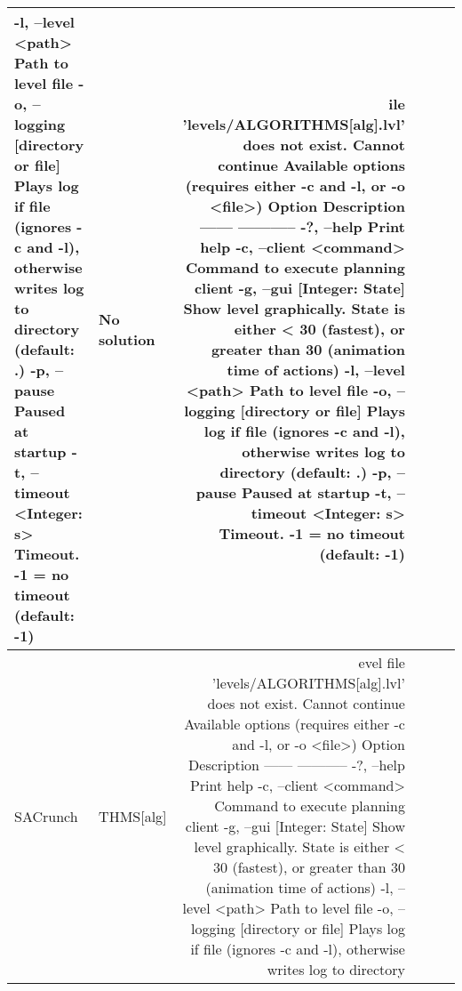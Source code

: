 \begin{tabular}{|l|l|r|r|r|r|}
-l, --level <path>                      Path to level file                     
-o, --logging [directory or file]       Plays log if file (ignores -c and -l), 
                                          otherwise writes log to directory    
                                          (default: .)                         
-p, --pause                             Paused at startup                      
-t, --timeout <Integer: s>              Timeout. -1 = no timeout (default: -1) 
 & No solution & ile 'levels/ALGORITHMS[alg].lvl' does not exist. Cannot continue
Available options (requires either -c and -l, or -o <file>)
Option                                  Description                            
------                                  -----------                            
-?, --help                              Print help                             
-c, --client <command>                  Command to execute planning client     
-g, --gui [Integer: State]              Show level graphically. State is       
                                          either  < 30 (fastest), or greater   
                                          than 30 (animation time of actions)  
-l, --level <path>                      Path to level file                     
-o, --logging [directory or file]       Plays log if file (ignores -c and -l), 
                                          otherwise writes log to directory    
                                          (default: .)                         
-p, --pause                             Paused at startup                      
-t, --timeout <Integer: s>              Timeout. -1 = no timeout (default: -1) 
\\  \hline
SACrunch & THMS[alg] & evel file 'levels/ALGORITHMS[alg].lvl' does not exist. Cannot continue
Available options (requires either -c and -l, or -o <file>)
Option                                  Description                            
------                                  -----------                            
-?, --help                              Print help                             
-c, --client <command>                  Command to execute planning client     
-g, --gui [Integer: State]              Show level graphically. State is       
                                          either  < 30 (fastest), or greater   
                                          than 30 (animation time of actions)  
-l, --level <path>                      Path to level file                     
-o, --logging [directory or file]       Plays log if file (ignores -c and -l), 
                                          otherwise writes log to directory    

\end{tabular}

